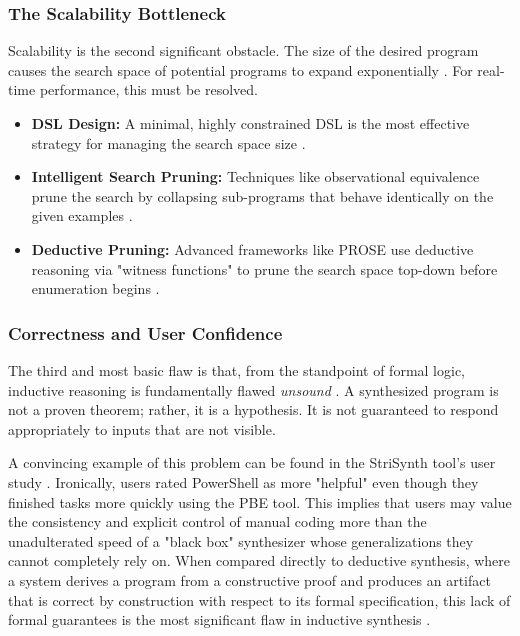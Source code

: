 \documentclass[12pt, a4paper]{report}
\begin{document}
\subsubsection{The Scalability Bottleneck}

Scalability is the second significant obstacle. The size of the desired program causes the search space of potential programs to expand exponentially \citep{summers1977methodology}. For real-time performance, this must be resolved.

\begin{itemize}
    \item \textbf{DSL Design:} A minimal, highly constrained DSL is the most effective strategy for managing the search space size \citep{gulwani2011automating}.
    \item \textbf{Intelligent Search Pruning:} Techniques like observational equivalence prune the search by collapsing sub-programs that behave identically on the given examples \citep{udupa2013transit}.
    \item \textbf{Deductive Pruning:} Advanced frameworks like PROSE use deductive reasoning via "witness functions" to prune the search space top-down before enumeration begins \citep{polozov2015flashmeta}.
\end{itemize}

\subsubsection{Correctness and User Confidence}

The third and most basic flaw is that, from the standpoint of formal logic, inductive reasoning is fundamentally flawed \textit{unsound} \citep{summers1977methodology}. A synthesized program is not a proven theorem; rather, it is a hypothesis. It is not guaranteed to respond appropriately to inputs that are not visible.

A convincing example of this problem can be found in the StriSynth tool's user study \citep{mayer2015user}. Ironically, users rated PowerShell as more "helpful" even though they finished tasks more quickly using the PBE tool. This implies that users may value the consistency and explicit control of manual coding more than the unadulterated speed of a "black box" synthesizer whose generalizations they cannot completely rely on. When compared directly to deductive synthesis, where a system derives a program from a constructive proof and produces an artifact that is correct by construction with respect to its formal specification, this lack of formal guarantees is the most significant flaw in inductive synthesis \citep{dramnesc2005proof}.
\end{document}
